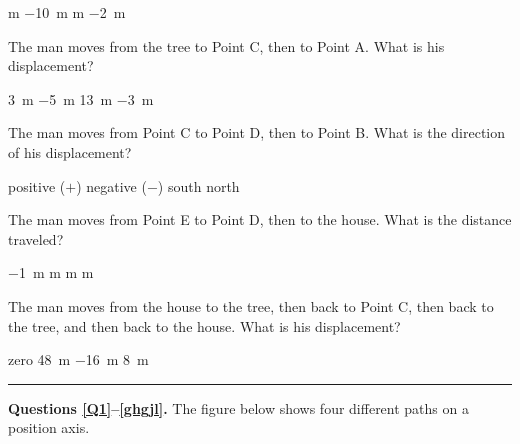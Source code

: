 \documentclass[]{exam}
\begin{document}
\begin{questions}
\begin{choices}
 m
\choice \SI{-10}{m}
 m
\choice \SI{-2}{m}
\end{choices}

\question
The man moves from the tree to Point C, then to Point A. What is his displacement?

\begin{choices}
\CorrectChoice \SI{3}{m}
\choice \SI{-5}{m}
\choice \SI{13}{m}
\choice \SI{-3}{m}
\end{choices}

\ifprintanswers
\else
\clearpage
\fi

\question
The man moves from Point C to Point D, then to Point B. What is the direction of his displacement?

\begin{choices}
\choice positive ($+$)
\CorrectChoice negative ($-$)
\choice south
\choice north
\end{choices}

\question
The man moves from Point E to Point D, then to the house. What is the distance traveled?

\begin{choices}
\choice \SI{-1}{m}
 m
 m
 m
\end{choices}


\question \label{KIWye}
The man moves from the house to the tree, then back to Point C, then back to the tree, and then back to the house. What is his displacement?

\begin{choices}
\CorrectChoice zero
\choice \SI{48}{m}
\choice \SI{-16}{m}
\choice \SI{8}{m}
\end{choices}

\bigskip

\hrule

\begin{EnvUplevel}
    
\textbf{Questions \ref{Q1}--\ref{ghgjl}.} The figure below shows four different paths on a position axis.

\begin{center}
\end{center}
\end{EnvUplevel}




\end{questions}
\end{document}
